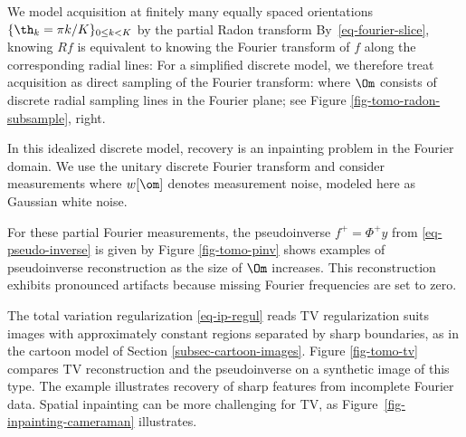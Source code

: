 

We model acquisition at finitely many equally spaced orientations $\{\th_k=\pi k/K\}_{0\leq k<K}$ by the partial Radon transform
By~\eqref{eq-fourier-slice}, knowing $R f$ is equivalent to knowing the Fourier transform of $f$ along the corresponding radial lines:
For a simplified discrete model, we therefore treat acquisition as direct sampling of the Fourier transform:
where $\Om$ consists of discrete radial sampling lines in the Fourier plane; see Figure \ref{fig-tomo-radon-subsample}, right.

In this idealized discrete model, recovery is an inpainting problem in the Fourier domain. We use the unitary discrete Fourier transform and consider measurements
where $w[\om]$ denotes measurement noise, modeled here as Gaussian white noise.


For these partial Fourier measurements, the pseudoinverse $f^+ = \Phi^+ y$ from \eqref{eq-pseudo-inverse} is given by
Figure \ref{fig-tomo-pinv} shows examples of pseudoinverse reconstruction as the size of $\Om$ increases. This reconstruction exhibits pronounced artifacts because missing Fourier frequencies are set to zero.

The total variation regularization \eqref{eq-ip-regul} reads
TV regularization suits images with approximately constant regions separated by sharp boundaries, as in the cartoon model of Section \ref{subsec-cartoon-images}. Figure \ref{fig-tomo-tv} compares TV reconstruction and the pseudoinverse on a synthetic image of this type. The example illustrates recovery of sharp features from incomplete Fourier data. Spatial inpainting can be more challenging for TV, as Figure~\ref{fig-inpainting-cameraman} illustrates.

